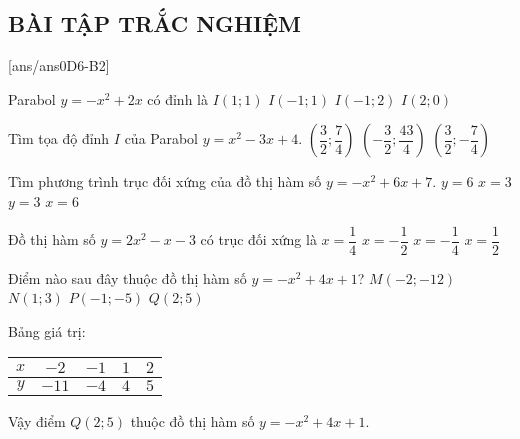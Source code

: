 \subsection{BÀI TẬP TRẮC NGHIỆM}
[ans/ans0D6-B2]

\begin{ex}%
	Parabol $y=-x^2+2x$ có đỉnh là
	\choice 
	{\True $I(1;1)$}
	{$I(-1;1)$}
	{$I(-1;2)$}
	{$I(2;0)$}
\end{ex}

\begin{ex}%
	Tìm tọa độ đỉnh $I$ của Parabol $y=x^2-3x+4$.
	{\True $\left(\dfrac{3}{2};\dfrac{7}{4}\right)$}
	{$\left(-\dfrac{3}{2};\dfrac{43}{4}\right)$}
	{$\left(\dfrac{3}{2};-\dfrac{7}{4}\right)$}
\end{ex}


\begin{ex}%
	Tìm phương trình trục đối xứng của đồ thị hàm số $y=-x^2+6x+7$.
	\choice
	{$y=6$}
	{\True $x=3$}
	{$y=3$}
	{$x=6$}
\end{ex}

\begin{ex}%
	Đồ thị hàm số $y=2x^2 - x - 3$ có trục đối xứng là 
	\choice
	{\True $x=\dfrac{1}{4}$}
	{$x= - \dfrac{1}{2}$}
	{$x= - \dfrac{1}{4}$}
	{$x=\dfrac{1}{2}$}
\end{ex}

\begin{ex}%
	Điểm nào sau đây thuộc đồ thị hàm số $y = -x^2 + 4x + 1$?
	\choice
	{$M(-2;-12)$}
	{$N(1;3)$}
	{$P(-1;-5)$}
	{\True $Q(2;5)$}
	\loigiai
	{
		Bảng giá trị:
		\begin{center}
			\begin{tabular}{|c|c|c|c|c|}
				\hline
				$x$ & $-2$ & $-1$ & $1$ & $2$\\
				\hline
				$y$ & $-11$ & $-4$ & $4$ & $5$\\
				\hline
			\end{tabular}
		\end{center}
		Vậy điểm $Q(2;5)$ thuộc đồ thị hàm số $y = -x^2 + 4x + 1$.
	}
\end{ex}

